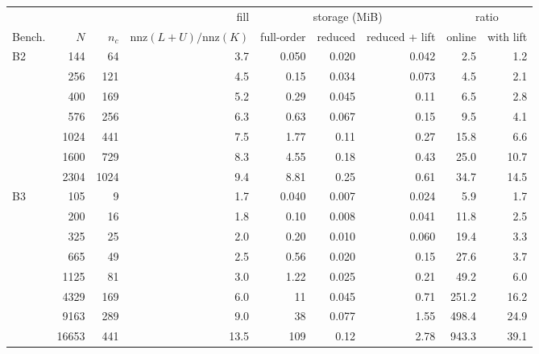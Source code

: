 \begin{tabular}{@{}lrrrrrrrr@{}}
\toprule
 & & & fill & \multicolumn{3}{c}{storage (MiB)} & \multicolumn{2}{c}{ratio} \\
\cmidrule(lr){5-7}\cmidrule(lr){8-9}
Bench. & $N$ & $n_c$ & $\mathrm{nnz}(L{+}U)/\mathrm{nnz}(K)$ & full-order & reduced & reduced + lift & online & with lift \\
\midrule
B2 & 144 & 64 & 3.7 & 0.050 & 0.020 & 0.042 & 2.5 & 1.2 \\
 & 256 & 121 & 4.5 & 0.15 & 0.034 & 0.073 & 4.5 & 2.1 \\
 & 400 & 169 & 5.2 & 0.29 & 0.045 & 0.11 & 6.5 & 2.8 \\
 & 576 & 256 & 6.3 & 0.63 & 0.067 & 0.15 & 9.5 & 4.1 \\
 & 1024 & 441 & 7.5 & 1.77 & 0.11 & 0.27 & 15.8 & 6.6 \\
 & 1600 & 729 & 8.3 & 4.55 & 0.18 & 0.43 & 25.0 & 10.7 \\
 & 2304 & 1024 & 9.4 & 8.81 & 0.25 & 0.61 & 34.7 & 14.5 \\
\midrule
B3 & 105 & 9 & 1.7 & 0.040 & 0.007 & 0.024 & 5.9 & 1.7 \\
 & 200 & 16 & 1.8 & 0.10 & 0.008 & 0.041 & 11.8 & 2.5 \\
 & 325 & 25 & 2.0 & 0.20 & 0.010 & 0.060 & 19.4 & 3.3 \\
 & 665 & 49 & 2.5 & 0.56 & 0.020 & 0.15 & 27.6 & 3.7 \\
 & 1125 & 81 & 3.0 & 1.22 & 0.025 & 0.21 & 49.2 & 6.0 \\
 & 4329 & 169 & 6.0 & 11 & 0.045 & 0.71 & 251.2 & 16.2 \\
 & 9163 & 289 & 9.0 & 38 & 0.077 & 1.55 & 498.4 & 24.9 \\
 & 16653 & 441 & 13.5 & 109 & 0.12 & 2.78 & 943.3 & 39.1 \\
\bottomrule
\end{tabular}
